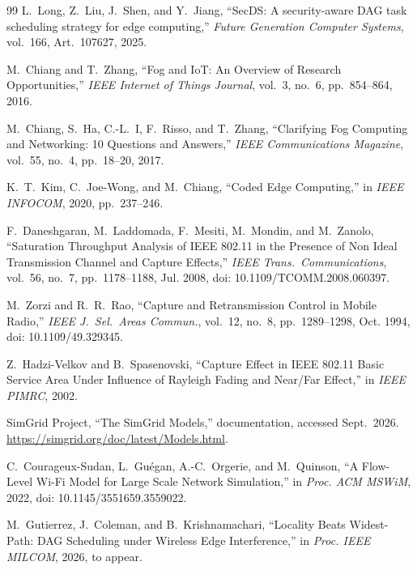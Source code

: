 \documentclass[conference]{IEEEtran}
\begin{document}
\begin{thebibliography}{99}
L.~Long, Z.~Liu, J.~Shen, and Y.~Jiang,
``{SecDS}: A security-aware {DAG} task scheduling strategy for edge
computing,''
\emph{Future Generation Computer Systems}, vol.~166, Art.~107627, 2025.

M.~Chiang and T.~Zhang,
``Fog and {IoT}: An Overview of Research Opportunities,''
\emph{IEEE Internet of Things Journal},
vol.~3, no.~6, pp.~854--864, 2016.

M.~Chiang, S.~Ha, C.-L.~I, F.~Risso, and T.~Zhang,
``Clarifying Fog Computing and Networking: 10 Questions and Answers,''
\emph{IEEE Communications Magazine},
vol.~55, no.~4, pp.~18--20, 2017.

K.~T.~Kim, C.~Joe-Wong, and M.~Chiang,
``Coded Edge Computing,''
in \emph{IEEE INFOCOM}, 2020, pp.~237--246.

F.~Daneshgaran, M.~Laddomada, F.~Mesiti, M.~Mondin, and M.~Zanolo,
``Saturation Throughput Analysis of {IEEE} 802.11 in the Presence of Non
Ideal Transmission Channel and Capture Effects,''
\emph{IEEE Trans.\ Communications},
vol.~56, no.~7, pp.~1178--1188, Jul. 2008, doi: 10.1109/TCOMM.2008.060397.

M.~Zorzi and R.~R.~Rao,
``Capture and Retransmission Control in Mobile Radio,''
\emph{IEEE J.\ Sel.\ Areas Commun.},
vol.~12, no.~8, pp.~1289--1298, Oct. 1994, doi: 10.1109/49.329345.

Z.~Hadzi-Velkov and B.~Spasenovski,
``Capture Effect in {IEEE} 802.11 Basic Service Area Under Influence of
{R}ayleigh Fading and Near/Far Effect,''
in \emph{IEEE PIMRC}, 2002.

SimGrid Project, ``The SimGrid Models,'' documentation, accessed Sept.~2026.
\url{https://simgrid.org/doc/latest/Models.html}.

C.~Courageux-Sudan, L.~Gu\'egan, A.-C.~Orgerie, and M.~Quinson,
``A Flow-Level Wi-Fi Model for Large Scale Network Simulation,''
in \emph{Proc. ACM MSWiM}, 2022, doi: 10.1145/3551659.3559022.

M.~Gutierrez, J.~Coleman, and B.~Krishnamachari,
``Locality Beats Widest-Path: DAG Scheduling under Wireless Edge Interference,''
in \emph{Proc. IEEE MILCOM}, 2026, to appear.

\end{thebibliography}
\end{document}

